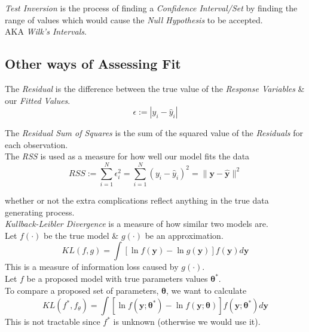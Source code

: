 \documentclass[11pt,a4paper]{article}
\begin{document}

\textit{Test Inversion} is the process of finding a \textit{Confidence Interval/Set} by finding the range of values which would cause the \textit{Null Hypothesis} to be accepted.\\
\nb AKA \textit{Wilk's Intervals}.\\



\subsection{Other ways of Assessing Fit}

The \textit{Residual} is the difference between the true value of the \textit{Response Variables} \& our \textit{Fitted Values}.
$$\epsilon:=|y_i-\hat{y}_i|$$

The \textit{Residual Sum of Squares} is the sum of the squared value of the \textit{Residuals} for each observation.\\
The \textit{RSS} is used as a measure for how well our model fits the data
$$RSS:=\sum_{i=1}^N\epsilon_i^2=\sum_{i=1}^N(y_i-\hat{y}_i)^2=\|\textbf{y}-\hat{\textbf{y}}\|^2$$

whether or not the extra complications reflect anything in the true data generating process.\\

\textit{Kullback-Leibler Divergence} is a measure of how similar two models are.\\
Let $f(\cdot)$ be the true model \& $g(\cdot)$ be an approximation.
$$KL(f,g)=\int[\ln f(\textbf{y})-\ln g(\textbf{y})]f(\textbf{y})d\textbf{y}$$
\nb This is a measure of information loss caused by $g(\cdot)$.\\

Let $f$ be a proposed model with true parameters values $\pmb\theta^*$.\\
To compare a proposed set of parameters, $\pmb\theta$, we want to calculate
$$KL(f^*,f_\theta)=\int[\ln f(\textbf{y};\pmb\theta^*)-\ln f(\textbf{y};\pmb\theta)]f(\textbf{y};\pmb\theta^*)d\textbf{y}$$
\nb This is not tractable since $f^*$ is unknown (otherwise we would use it).\\
\end{document}
